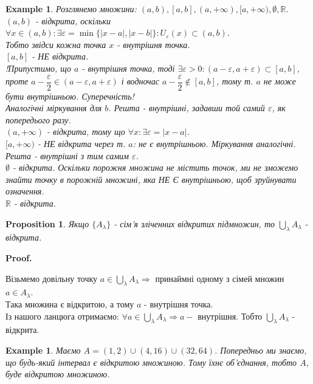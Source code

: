 \documentclass[a4paper, 14pt]{article}
\makeatletter
\def\huge{\displaystyle}
\def\qed{$\blacksquare$}
\theoremstyle{theoremdd}
\theoremstyle{theoremdd}
\theoremstyle{theoremdd}
\theoremstyle{theoremdd}
\newtheorem{example}[theorem]{Example}
\theoremstyle{theoremdd}
\newtheorem{proposition}[theorem]{Proposition}
\theoremstyle{theoremdd}
\theoremstyle{theoremdd}
\theoremstyle{theoremdd}
\renewenvironment{proof}[1][Proof.\\]{\par
\pushQED{\hfill \qed}%
\normalfont \topsep6\p@\@plus6\p@\relax
\trivlist
\item\relax
{\bfseries
#1\@addpunct{.}}\hspace\labelsep\ignorespaces
}{%
\popQED\endtrivlist\@endpefalse
}
\makeatother
\begin{document}
\begin{example}
Розглянемо множини: $(a,b), [a,b], (a,+\infty), [a,+\infty), \emptyset, \mathbb{R}$.\\
$(a,b)$ - відкрита, оскільки $\forall x \in (a,b): \exists \varepsilon = \min\{|x-a|,|x-b|\}:  U_{\varepsilon}(x) \subset (a,b)$.\\
Тобто звідси кожна точка $x$ - внутрішня точка.
\bigskip \\
$[a,b]$ - НЕ відкрита.\\
!Припустимо, що $a$ - внутрішня точка, тоді $\exists \varepsilon > 0: (a-\varepsilon, a+\varepsilon) \subset [a,b]$, проте $a-\dfrac{\varepsilon}{2} \in (a - \varepsilon, a + \varepsilon)$ і водночас $a-\dfrac{\varepsilon}{2} \not \in [a,b]$, тому т. $a$ не може бути внутрішньою. Суперечність! \\
Аналогічні міркування для $b$. Решта - внутрішні, задавши той самий $\varepsilon$, як попередього разу.
\bigskip \\
$(a,+\infty)$ - відкрита, тому що $\forall x: \exists \varepsilon = |x-a|$.
\bigskip \\
$[a,+\infty)$ - НЕ відкрита через т. $a$: не є внутрішньою. Міркування аналогічні. Решта - внутрішні з тим самим $\varepsilon$.
\bigskip \\
$\emptyset$ - відкрита. Оскільки порожня множина не містить точок, ми не зможемо знайти точку в порожній множині, яка НЕ Є внутрішньою, щоб зруйнувати означення.
\bigskip \\
$\mathbb{R}$ - відкрита.
\bigskip \\
\end{example}

\begin{proposition}
Якщо $\{A_{\lambda}\}$ - сім'я зліченних відкритих підмножин, то $\huge \bigcup_{\lambda} A_{\lambda}$ - відкрита.
\end{proposition}

\begin{proof}
Візьмемо довільну точку $a \in \huge \bigcup_{\lambda} A_{\lambda} \Rightarrow$ принаймні одному з сімей множин $a \in A_{\lambda}$.\\
Така множина є відкритою, а тому $a$ - внутрішня точка.\\
Із нашого ланцюга отримаємо: $\forall a \in \huge \bigcup_{\lambda} A_{\lambda} \Rightarrow a - $ внутрішня. Тобто $\huge \bigcup_{\lambda} A_{\lambda}$ - відкрита.
\end{proof}

\begin{example}
Маємо $A = (1,2) \cup (4,16) \cup (32, 64)$. Попередньо ми знаємо, що будь-який інтервал є відкритою множиною. Тому їхнє об'єднання, тобто $A$, буде відкритою множиною.
\end{example}
\end{document}
